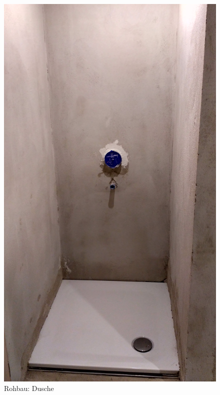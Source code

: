 \begin{figure}[h]
	\begin{center}
		\noindent\includegraphics[scale=0.1]{Resources/Praktikum/IMG_20180731_085142_HDR.jpg}
		\caption{Rohbau: Dusche}	
	\end{center}
\end{figure}

